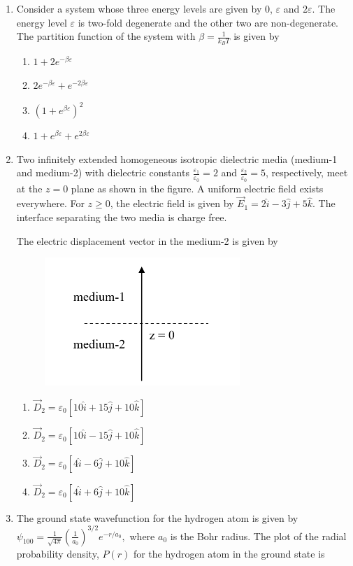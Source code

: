 \documentclass[journal,12pt,onecolumn]{IEEEtran}
\theoremstyle{remark}
\begin{document}
\begin{enumerate}
\begin{figure}[H]
    \caption*{}
    \label{fig:Q37(2)}
    \end{figure}
\item Consider a system whose three energy levels are given by $0$, $\varepsilon$ and $2\varepsilon$. The energy level $\varepsilon$ is two-fold degenerate and the other two are non-degenerate. The partition function of the system with $\beta = \frac{1}{k_{B}T}$ is given by
\begin{multicols}{2}
\begin{enumerate}
\item $1 + 2e^{-\beta\varepsilon}$
\item $2e^{-\beta\varepsilon} + e^{-2\beta\varepsilon}$
\item $(1 + e^{\beta\varepsilon})^{2}$
\item $1 + e^{\beta\varepsilon} + e^{2\beta\varepsilon}$
\end{enumerate}
\end{multicols}

\item Two infinitely extended homogeneous isotropic dielectric media (medium-1 and medium-2) with dielectric constants $\frac{\varepsilon_{1}}{\varepsilon_{0}} = 2$ and $\frac{\varepsilon_{2}}{\varepsilon_{0}} = 5$, respectively, meet at the $z=0$ plane as shown in the figure. A uniform electric field exists everywhere. For $z \geq 0$, the electric field is given by $\vec{E}_{1} = 2\hat{i} - 3\hat{j} + 5\hat{k}$. The interface separating the two media is charge free.

The electric displacement vector in the medium-2 is given by
\begin{figure}[H]
    \centering
    \includegraphics[width = 0.35\columnwidth]{fig/Q39.png}
    \caption*{}
    \label{fig:Q39}
\end{figure}
\begin{multicols}{2}
\begin{enumerate}
\item $\vec{D}_{2} = \varepsilon_{0}[10\hat{i} + 15\hat{j} + 10\hat{k}]$
\item $\vec{D}_{2} = \varepsilon_{0}[10\hat{i} - 15\hat{j} + 10\hat{k}]$
\item $\vec{D}_{2} = \varepsilon_{0}[4\hat{i} - 6\hat{j} + 10\hat{k}]$
\item $\vec{D}_{2} = \varepsilon_{0}[4\hat{i} + 6\hat{j} + 10\hat{k}]$
\end{enumerate}
\end{multicols}
\item  The ground state wavefunction for the hydrogen atom is given by $\psi_{100} = \frac{1}{\sqrt{4\pi}} \left( \frac{1}{a_{0}} \right)^{3/2} e^{-r/a_{0}},$ where $a_{0}$ is the Bohr radius.
The plot of the radial probability density, $P(r)$ for the hydrogen atom in the ground state is


\end{enumerate}
\end{document}
